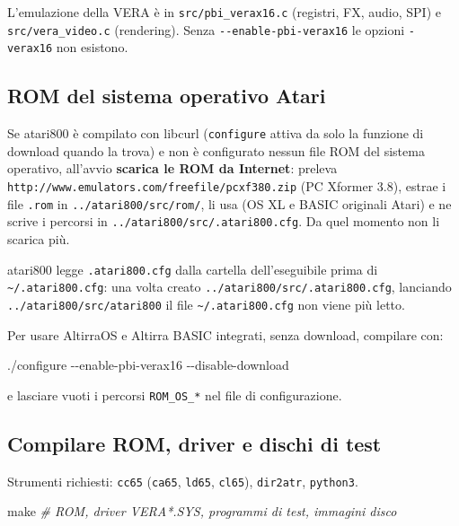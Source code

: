 \documentclass[
]{article}
\newenvironment{Shaded}{}{}
\newcommand{\AttributeTok}[1]{\textcolor[rgb]{0.49,0.56,0.16}{#1}}
\newcommand{\CommentTok}[1]{\textcolor[rgb]{0.38,0.63,0.69}{\textit{#1}}}
\newcommand{\ExtensionTok}[1]{#1}
\newcommand{\FunctionTok}[1]{\textcolor[rgb]{0.02,0.16,0.49}{#1}}
\begin{document}
L'emulazione della VERA è in \texttt{src/pbi\_verax16.c} (registri, FX,
audio, SPI) e \texttt{src/vera\_video.c} (rendering). Senza
\texttt{-\/-enable-pbi-verax16} le opzioni \texttt{-verax16} non
esistono.

\subsection{ROM del sistema operativo
Atari}\label{rom-del-sistema-operativo-atari}

Se atari800 è compilato con libcurl (\texttt{configure} attiva da solo
la funzione di download quando la trova) e non è configurato nessun file
ROM del sistema operativo, all'avvio \textbf{scarica le ROM da
Internet}: preleva
\texttt{http://www.emulators.com/freefile/pcxf380.zip} (PC Xformer 3.8),
estrae i file \texttt{.rom} in \texttt{../atari800/src/rom/}, li usa (OS
XL e BASIC originali Atari) e ne scrive i percorsi in
\texttt{../atari800/src/.atari800.cfg}. Da quel momento non li scarica
più.

atari800 legge \texttt{.atari800.cfg} dalla cartella dell'eseguibile
prima di \texttt{\textasciitilde{}/.atari800.cfg}: una volta creato
\texttt{../atari800/src/.atari800.cfg}, lanciando
\texttt{../atari800/src/atari800} il file
\texttt{\textasciitilde{}/.atari800.cfg} non viene più letto.

Per usare AltirraOS e Altirra BASIC integrati, senza download, compilare
con:

\begin{Shaded}
\begin{Highlighting}[]
\ExtensionTok{./configure} \AttributeTok{{-}{-}enable{-}pbi{-}verax16} \AttributeTok{{-}{-}disable{-}download}
\end{Highlighting}
\end{Shaded}

e lasciare vuoti i percorsi \texttt{ROM\_OS\_*} nel file di
configurazione.

\subsection{Compilare ROM, driver e dischi di
test}\label{compilare-rom-driver-e-dischi-di-test}

Strumenti richiesti: \texttt{cc65} (\texttt{ca65}, \texttt{ld65},
\texttt{cl65}), \texttt{dir2atr}, \texttt{python3}.

\begin{Shaded}
\begin{Highlighting}[]
\FunctionTok{make}            \CommentTok{\# ROM, driver VERA*.SYS, programmi di test, immagini disco}
\end{Highlighting}
\end{Shaded}
\end{document}
